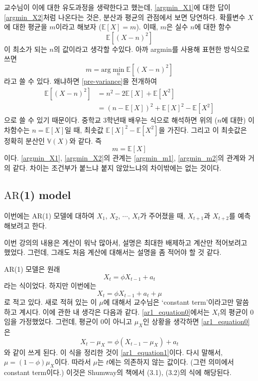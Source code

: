 \documentclass{article}
\newcommand\ar{\ensuremath{\text{AR}}}
\begin{document}
교수님이 이에 대한 유도과정을 생략한다고 했는데, \eqref{argmin_X1}에 대한 답이 \eqref{argmin_X2}처럼 나온다는 것은, 분산과 평균의 관점에서 보면 당연하다.
확률변수 \(X\)에 대한 평균을 \(m\)이라고 해보자 (\(\mathbb E[X]=m\)).
이때, \(m\)은 실수 \(n\)에 대한 함수
\begin{equation}\label{pre-variance}
\mathbb E[(X-n)^2]
\end{equation}
이 최소가 되는 \(n\)의 값이라고 생각할 수있다.
아까 argmin를 사용해 표현한 방식으로 쓰면
\begin{equation}\label{argmin_m1}
m=\text{arg}\min_{n}\mathbb E[(X-n)^2]
\end{equation}
라고 쓸 수 있다.
왜냐하면 \eqref{pre-variance}을 전개하여
\begin{align*}
\mathbb E[(X-n)^2]
&=n^2-2\mathbb E[X]+\mathbb E[X^2]\\
&=\left(n-\mathbb E[X]\right)^2+\mathbb E[X]^2-\mathbb E[X^2]
\end{align*}
으로 쓸 수 있기 때문이다.
중학교 3학년때 배우는 식으로 해석하면 위의 (\(n\)에 대한) 이차함수는 \(n=\mathbb E[X]\)일 때, 최솟값 \(\mathbb E[X]^2-\mathbb E[X^2]\)을 가진다.
그리고 이 최솟값은 정확히 분산인 \(\mathbb V(X)\)와 같다.
즉
\begin{equation}\label{argmin_m2}
m=\mathbb E[X]
\end{equation}
이다.
\eqref{argmin_X1}, \eqref{argmin_X2}의 관계는 \eqref{argmin_m1}, \eqref{argmin_m2}의 관계와 거의 같다.
차이는 조건부가 붙느냐 붙지 않았느냐의 차이밖에는 없는 것이다.

\subsection{\ar(1) model}
이번에는 \ar(1) 모델에 대하여 \(X_1\), \(X_2\), \(\cdots\), \(X_t\)가 주어졌을 때, \(X_{t+1}\)과 \(X_{t+2}\)를 예측해보려고 한다.

이번 강의의 내용은 계산이 워낙 많아서, 설명은 최대한 배제하고 계산만 적어보려고 했었다.
그런데, 그래도 처음 계산에 대해서는 설명을 좀 적어야 할 것 같다.

\ar(1) 모델은 원래
\begin{equation}\label{ar1_equation0}
X_t=\phi X_{t-1}+a_t
\end{equation}
라는 식이었다.
하지만 이번에는
\begin{equation}\label{ar1_equation1}
X_t=\phi X_{t-1}+a_t+\mu
\end{equation}
로 적고 있다.
새로 적혀 있는 이 \(\mu\)에 대해서 교수님은 `constant term'이라고만 말씀하고 계시다.
이에 관한 내 생각은 다음과 같다.
\eqref{ar1_equation0}에서는 \(X_t\)의 평균이 0임을 가정했었다.
그런데, 평균이 0이 아니고 \(\mu_X\)인 상황을 생각하면
\eqref{ar1_equation0}은
\[X_t-\mu_X=\phi(X_{t-1}-\mu_X)+a_t\]
와 같이 쓰게 된다.
이 식을 정리한 것이 \eqref{ar1_equation1}이다.
다시 말해서, \(\mu=(1-\phi)\mu_X\)이다.
따라서 \(\mu\)는 \(t\)에는 의존하지 않는 값이다.
(그런 의미에서 constant term이다.)
이것은 Shumway의 책에서 (3.1), (3.2)의 식에 해당된다.
\end{document}
